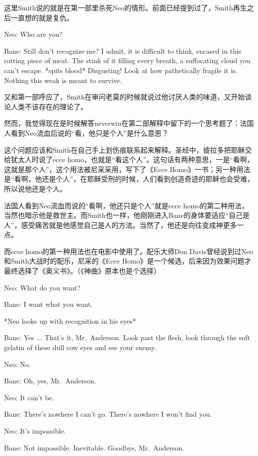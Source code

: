 \documentclass[UTF8]{ctexart}
\newenvironment{myquote}{\color{green} \setlength{\leftskip}{6em} \setlength{\rightskip}{4em} \setlength{\parindent}{-2em}}{\par}
\begin{document}
这里Smith说的就是在第一部里杀死Neo的情形。前面已经提到过了，Smith再生之后一直想的就是复仇。

\begin{myquote}
Neo: Who are you?

Bane: Still don't recognize me? I admit, it is difficult to think, encased in this rotting piece of meat. The stink of it filling every breath, a suffocating cloud you can't escape. *spits blood* Disgusting! Look at how pathetically fragile it is. Nothing this weak is meant to survive.
\end{myquote}

又和第一部呼应了，Smith在审问老莫的时候就说过他讨厌人类的味道，又开始谈论人类不该存在的理论了。

然而，我觉得现在是时候解答neverwin在第二部解释中留下的一个思考题了：法国人看到Neo流血后说的“看，他只是个人”是什么意思？

这个问题应该和Smith在自己手上划伤痕联系起来解释。圣经中，彼拉多把耶稣交给犹太人时说了ecce homo，也就是“看这个人”。这句话有两种意思，一是“看啊，这就是那个人”，这个用法被尼采采用，写下了《Ecce Homo》一书；另一种用法是“看啊，他还是个人”，在耶稣受刑的时候，人们看到创造奇迹的耶稣也会受难，所以说他还是个人。

法国人看到Neo流血而说的“看啊，他还只是个人”就是ecce homo的第二种用法，当然也暗示他是救世主。而Smith也一样，他刚刚进入Bane的身体要适应“自己是人”，感受痛苦就是他感觉自己是人的方法。当然了，他还是向往变成神更多一点。

而ecce homo的第一种用法也在电影中使用了。配乐大师Don Davis曾经说到过Neo和Smith大战时的配乐，尼采的《Ecce Homo》是一个候选，后来因为效果问题才最终选择了《奥义书》。（《神曲》原本也是个选择）

\begin{myquote}
Neo: What do you want?

Bane: I want what you want.

*Neo looks up with recognition in his eyes*

Bane: Yes ... That's it, Mr.~Anderson. Look past the flesh, look through the soft gelatin of these dull cow eyes and see your enemy.

Neo: No.

Bane: Oh, yes, Mr.~Anderson.

Neo: It can't be.

Bane: There's nowhere I can't go. There's nowhere I won't find you.

Neo: It's impossible.

Bane: Not impossible. Inevitable. Goodbye, Mr.~Anderson.
\end{myquote}
\end{document}
